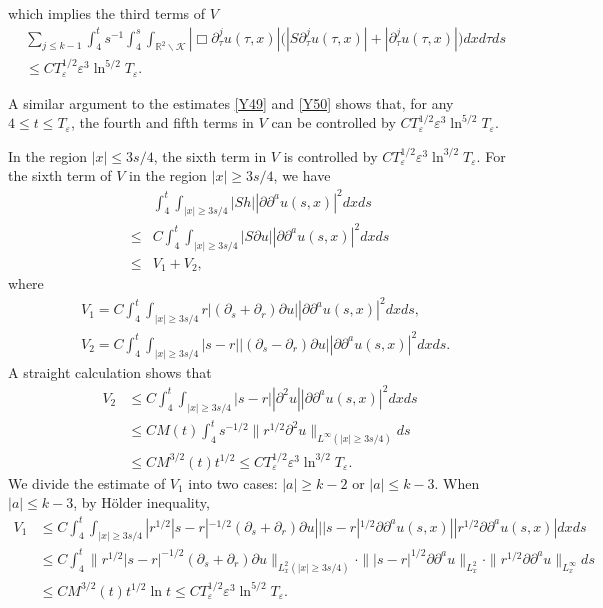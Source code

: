 \documentclass[11pt, reqno]{amsart}
\theoremstyle{definition}
\theoremstyle{remark}
\theoremstyle{definition}
\numberwithin{equation}{section}
\numberwithin{equation}{section}
\def\leq{\leqslant}
\def\geq{\geqslant}
\begin{document}
which implies the third terms of $V$
\begin{align}\label{Y50}
&\sum_{j\leq k-1}\int_4^ts^{-1}\int_4^s\int_{\mathbb
R^2\backslash\mathcal
{K}}|\Box\partial_{\tau}^ju(\tau,x)|\big(|S\partial_{\tau}^ju(\tau,x)|+|\partial_{\tau}^ju(\tau,x)|\big)dxd\tau
ds
\nonumber\\&\leq CT_{\varepsilon}^{1/2}\varepsilon^3\ln^{5/2}T_{\varepsilon}.
\end{align}
\par A similar argument to the estimates \eqref{Y49} and \eqref{Y50} shows that,
for any $4\leq t\leq T_{\varepsilon}$, the fourth and fifth terms in $V$
can be controlled by $CT_{\varepsilon}^{1/2}\varepsilon^3\ln^{5/2}T_{\varepsilon}$.
\par In the region $|x|\leq3s/4$, the sixth term in $V$ is controlled by $CT_{\varepsilon}^{1/2}\varepsilon^3\ln^{3/2}T_{\varepsilon}$. For the sixth term
of $V$ in the region $|x|\geq3s/4$, we have
\begin{align*}
&\int_4^t\int_{|x|\geq3s/4}|Sh||\partial\partial^au(s,x)|^2dxds
\nonumber\\\leq& C\int_4^t\int_{|x|\geq3s/4}|S\partial u||\partial\partial^au(s,x)|^2dxds
\nonumber\\\leq& V_1+V_2,
\end{align*}
where
\begin{align*}
&V_1=C\int_4^t\int_{|x|\geq3s/4}r|(\partial_s+\partial_r)\partial u||\partial\partial^au(s,x)|^2dxds,
\nonumber\\&V_2=C\int_4^t\int_{|x|\geq3s/4}|s-r||(\partial_s-\partial_r)\partial u||\partial\partial^au(s,x)|^2dxds.
\end{align*}
A straight calculation shows that
\begin{align*}
V_2&\leq C\int_4^t\int_{|x|\geq3s/4}|s-r||\partial^2u||\partial\partial^au(s,x)|^2dxds
\\&\leq CM(t)\int_4^ts^{-1/2}\|r^{1/2}\partial^2u\|_{L^{\infty}(|x|\geq 3s/4)}ds
\\&\leq CM^{3/2}(t)t^{1/2}\leq CT_{\varepsilon}^{1/2}\varepsilon^3\ln^{3/2}T_{\varepsilon}.
\end{align*}
We divide the estimate of $V_1$ into two cases: $|a|\geq k-2$ or $|a|\leq k-3$. When $|a|\leq k-3$, by H\"{o}lder inequality,
\begin{align*}
V_1&\leq C\int_4^t\int_{|x|\geq3s/4}|r^{1/2}|s-r|^{-1/2}(\partial_s+\partial_r)\partial 
u|||s-r|^{1/2}\partial\partial^au(s,x)||r^{1/2}\partial\partial^au(s,x)|dxds
\\&\leq C\int_4^t\|r^{1/2}|s-r|^{-1/2}(\partial_s+\partial_r)\partial u\|_{L_x^2(|x|\geq 
3s/4)}\cdot\||s-r|^{1/2}\partial\partial^au\|_{L_x^2}\cdot\|r^{1/2}\partial\partial^au\|_{L^{\infty}_x}ds
\\&\leq CM^{3/2}(t)t^{1/2}\ln t\leq CT_{\varepsilon}^{1/2}\varepsilon^3\ln^{5/2}T_{\varepsilon}.
\end{align*}
\end{document}
